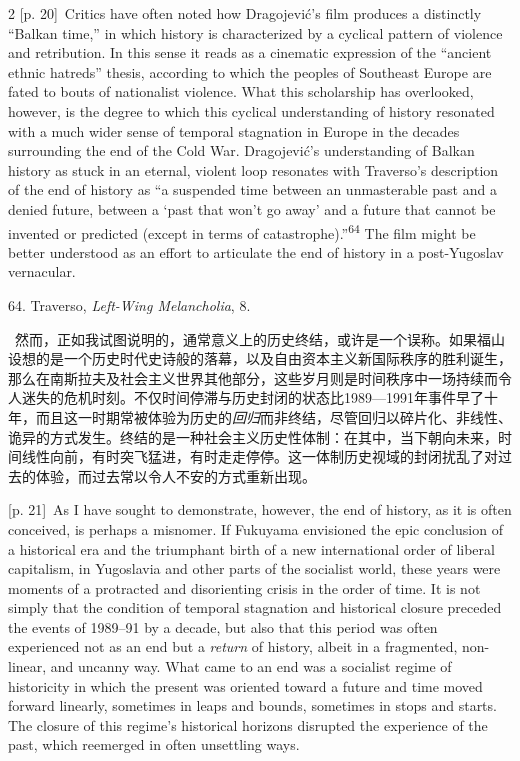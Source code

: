 \documentclass[10pt,a4paper]{article}
\begin{document}
\begin{paracol}{2}
\switchcolumn
{\scriptsize\color{gray} [p. 20]}\ Critics have often noted how Dragojević’s film produces a distinctly “Balkan time,” in which history is characterized by a cyclical pattern of violence and retribution. In this sense it reads as a cinematic expression of the “ancient ethnic hatreds” thesis, according to which the peoples of Southeast Europe are fated to bouts of nationalist violence. What this scholarship has overlooked, however, is the degree to which this cyclical understanding of history resonated with a much wider sense of temporal stagnation in Europe in the decades surrounding the end of the Cold War. Dragojević’s understanding of Balkan history as stuck in an eternal, violent loop resonates with Traverso’s description of the end of history as “a suspended time between an unmasterable past and a denied future, between a ‘past that won’t go away’ and a future that cannot be invented or predicted (except in terms of catastrophe).”\nobreak\textsuperscript{64} The film might be better understood as an effort to articulate the end of history in a post-Yugoslav vernacular.\par{\small 64. Traverso, \textit{Left-Wing Melancholia}, 8.\par}
\switchcolumn*
{\scriptsize\color{gray} [p. 21]}\ 然而，正如我试图说明的，通常意义上的历史终结，或许是一个误称。如果福山设想的是一个历史时代史诗般的落幕，以及自由资本主义新国际秩序的胜利诞生，那么在南斯拉夫及社会主义世界其他部分，这些岁月则是时间秩序中一场持续而令人迷失的危机时刻。不仅时间停滞与历史封闭的状态比1989—1991年事件早了十年，而且这一时期常被体验为历史的\textit{回归}而非终结，尽管回归以碎片化、非线性、诡异的方式发生。终结的是一种社会主义历史性体制：在其中，当下朝向未来，时间线性向前，有时突飞猛进，有时走走停停。这一体制历史视域的封闭扰乱了对过去的体验，而过去常以令人不安的方式重新出现。\par
\switchcolumn
{\scriptsize\color{gray} [p. 21]}\ As I have sought to demonstrate, however, the end of history, as it is often conceived, is perhaps a misnomer. If Fukuyama envisioned the epic conclusion of a historical era and the triumphant birth of a new international order of liberal capitalism, in Yugoslavia and other parts of the socialist world, these years were moments of a protracted and disorienting crisis in the order of time. It is not simply that the condition of temporal stagnation and historical closure preceded the events of 1989–91 by a decade, but also that this period was often experienced not as an end but a \textit{return} of history, albeit in a fragmented, non-linear, and uncanny way. What came to an end was a socialist regime of historicity in which the present was oriented toward a future and time moved forward linearly, sometimes in leaps and bounds, sometimes in stops and starts. The closure of this regime’s historical horizons disrupted the experience of the past, which reemerged in often unsettling ways.\par

\end{paracol}
\end{document}
